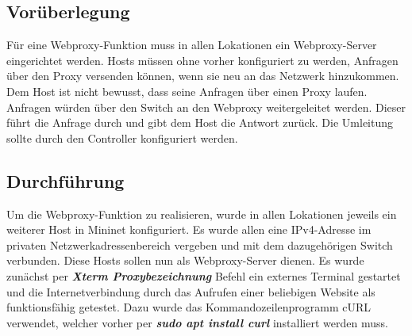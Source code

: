 \documentclass[fontsize=12pt,paper=a4,open=any,parskip=half,
  twoside=false,toc=listof,toc=bibliography,fleqn,leqno,
  captions=nooneline,captions=tableabove,british]{scrbook}
\begin{document}
\subsection{Vorüberlegung}
Für eine Webproxy-Funktion muss in allen Lokationen ein Webproxy-Server eingerichtet werden. Hosts müssen ohne vorher konfiguriert zu werden, Anfragen über den Proxy versenden können, wenn sie neu an das Netzwerk hinzukommen. Dem Host ist nicht bewusst, dass seine Anfragen über einen Proxy laufen. Anfragen würden über den Switch an den Webproxy weitergeleitet werden. Dieser führt die Anfrage durch und gibt dem Host die Antwort zurück. Die Umleitung sollte durch den Controller konfiguriert werden. 

\subsection{Durchführung}
Um die Webproxy-Funktion zu realisieren, wurde in allen Lokationen jeweils ein weiterer Host in Mininet konfiguriert. Es wurde allen eine IPv4-Adresse im privaten Netzwerkadressenbereich vergeben und mit dem dazugehörigen Switch verbunden. Diese Hosts sollen nun als Webproxy-Server dienen. Es wurde zunächst per \textit{\textbf{Xterm Proxybezeichnung}} Befehl ein externes Terminal gestartet und die Internetverbindung durch das Aufrufen einer beliebigen Website als funktionsfähig getestet. Dazu wurde das Kommandozeilenprogramm cURL verwendet, welcher vorher per \textit{\textbf{sudo apt install curl}} installiert werden muss.
\end{document}
